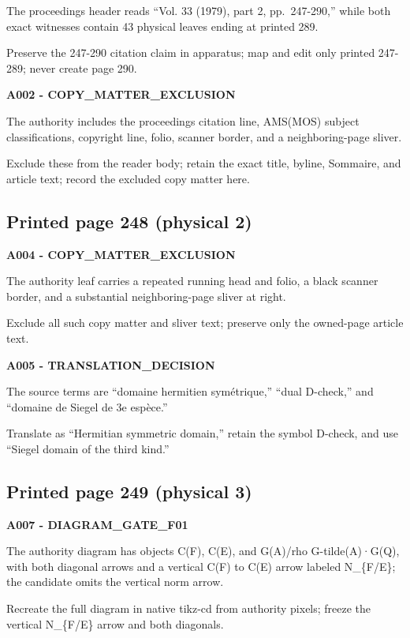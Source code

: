 \documentclass[10pt,a4paper]{article}
\begin{document}
The proceedings header reads ``Vol. 33 (1979), part 2, pp.~247-290,'' while both exact witnesses contain 43 physical leaves ending at printed 289.

Preserve the 247-290 citation claim in apparatus; map and edit only printed 247-289; never create page 290.

\textbf{A002 - COPY\_MATTER\_EXCLUSION}

The authority includes the proceedings citation line, AMS(MOS) subject classifications, copyright line, folio, scanner border, and a neighboring-page sliver.

Exclude these from the reader body; retain the exact title, byline, Sommaire, and article text; record the excluded copy matter here.

\subsection{Printed page 248 (physical 2)}

\textbf{A004 - COPY\_MATTER\_EXCLUSION}

The authority leaf carries a repeated running head and folio, a black scanner border, and a substantial neighboring-page sliver at right.

Exclude all such copy matter and sliver text; preserve only the owned-page article text.

\textbf{A005 - TRANSLATION\_DECISION}

The source terms are ``domaine hermitien symétrique,'' ``dual D-check,'' and ``domaine de Siegel de 3e espèce.''

Translate as ``Hermitian symmetric domain,'' retain the symbol D-check, and use ``Siegel domain of the third kind.''

\subsection{Printed page 249 (physical 3)}

\textbf{A007 - DIAGRAM\_GATE\_F01}

The authority diagram has objects C(F), C(E), and G(A)/rho G-tilde(A)·G(Q), with both diagonal arrows and a vertical C(F) to C(E) arrow labeled N\_\{F/E\}; the candidate omits the vertical norm arrow.

Recreate the full diagram in native tikz-cd from authority pixels; freeze the vertical N\_\{F/E\} arrow and both diagonals.
\end{document}

